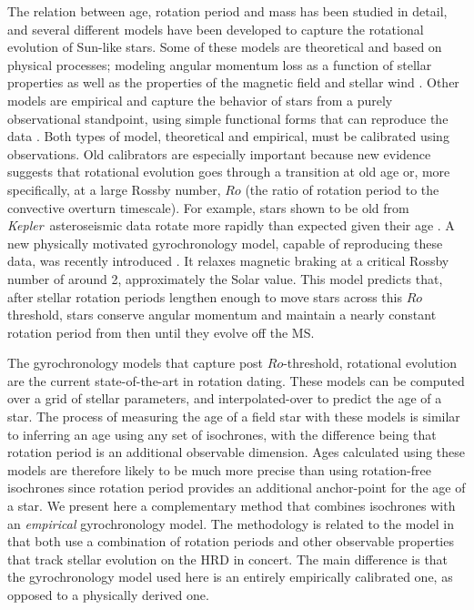 \documentclass[useAMS, usenatbib, preprint, 12pt]{aastex}
\newcommand{\eg}{{\it e.g.}}
\newcommand{\kepler}{{\it Kepler}}
\begin{document}
The relation between age, rotation period and mass has been studied in detail,
and several different models have been developed to capture the rotational
evolution of Sun-like stars.
Some of these models are theoretical and based on physical processes; modeling
angular momentum loss as a function of stellar properties as well as the
properties of the magnetic field and stellar wind \citep[\eg][]{kawaler1988,
kawaler1989, pinsonneault1989, vansaders2013, matt2015, vansaders2016}.
Other models are empirical and capture the behavior of stars from a purely
observational standpoint, using simple functional forms that can reproduce the
data \citep[\eg][]{barnes2003, barnes2007, mamajek2008, angus2015}.
Both types of model, theoretical and empirical, must be calibrated using
observations.
Old calibrators are especially important because new evidence suggests that
rotational evolution goes through a transition at old age or, more
specifically, at a large Rossby number, $Ro$ (the ratio of rotation period to
the convective overturn timescale).
For example, stars shown to be old from \kepler\ asteroseismic data rotate
more rapidly than expected given their age \citep{angus2015, vansaders2016}.
A new physically motivated gyrochronology model, capable of reproducing these
data, was recently introduced \citep{vansaders2016}.
It relaxes magnetic braking at a critical Rossby number of around 2,
approximately the Solar value.
This model predicts that, after stellar rotation periods lengthen enough to
move stars across this $Ro$ threshold, stars conserve angular momentum and
maintain a nearly constant rotation period from then until they evolve off the
MS.

The gyrochronology models that capture post $Ro$-threshold, rotational
evolution \citep{vansaders2016} are the current state-of-the-art in rotation
dating.
These models can be computed over a grid of stellar parameters, and
interpolated-over to predict the age of a star.
The process of measuring the age of a field star with these models is similar
to inferring an age using any set of isochrones, with the difference being
that rotation period is an additional observable dimension.
Ages calculated using these models are therefore likely to be much more
precise than using rotation-free isochrones since rotation period provides an
additional anchor-point for the age of a star.
We present here a complementary method that combines isochrones with an {\it
empirical} gyrochronology model.
The methodology is related to the \citet{vansaders2016} model in that both use
a combination of rotation periods and other observable properties that track
stellar evolution on the HRD in concert.
The main difference is that the gyrochronology model used here is an entirely
empirically calibrated one, as opposed to a physically derived one.
\end{document}
